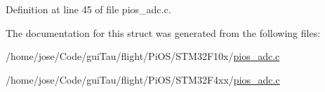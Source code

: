 Definition at line 45 of file pios\-\_\-adc.\-c.



The documentation for this struct was generated from the following files\-:\begin{DoxyCompactItemize}
\item 
/home/jose/\-Code/gui\-Tau/flight/\-Pi\-O\-S/\-S\-T\-M32\-F10x/\hyperlink{_s_t_m32_f10x_2pios__adc_8c}{pios\-\_\-adc.\-c}\item 
/home/jose/\-Code/gui\-Tau/flight/\-Pi\-O\-S/\-S\-T\-M32\-F4xx/\hyperlink{_s_t_m32_f4xx_2pios__adc_8c}{pios\-\_\-adc.\-c}\end{DoxyCompactItemize}
